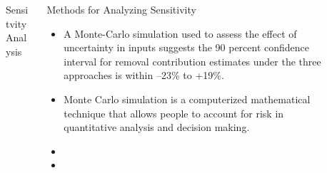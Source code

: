 \documentclass[final]{beamer}\usepackage[]{graphicx}\usepackage[]{color}
\newlength{\sepwid}
\newlength{\onecolwid}
\newlength{\twocolwid}
\begin{document}
\begin{frame}[t]
\begin{columns}[t]
\begin{column}{\twocolwid}
\begin{columns}[t,totalwidth=\twocolwid]
\begin{column}{\onecolwid}
\begin{block}{Sensitvity Analysis}
\end{block}


\end{column} %

\begin{column}{\onecolwid} %


\begin{block}{Methods for Analyzing Sensitivity}
\begin{itemize}
\item A Monte-Carlo simulation used to assess the effect of uncertainty in inputs suggests the 90 percent confidence interval for removal contribution estimates under the three approaches is within –23\% to +19\%.
\vspace{2ex}
\item Monte Carlo simulation is a computerized mathematical technique that allows people to account for risk in quantitative analysis and decision making.
\item
\item
\end{itemize}
\end{block}


\end{column} %

\end{columns} %

\end{column} %

\begin{column}{\sepwid}\end{column} %

\begin{column}{\onecolwid} %



\end{column}
\end{columns}
\end{frame}
\end{document}
